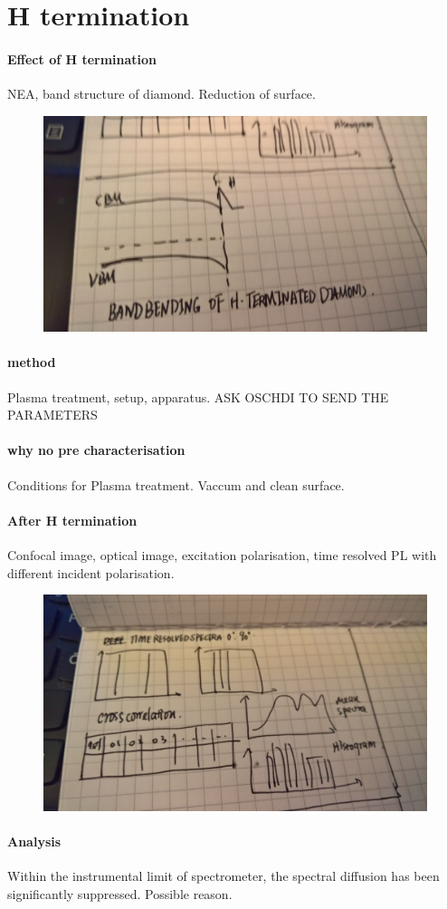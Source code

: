 
\section[H termination]{H termination}
\paragraph{Effect of H termination}

NEA, band structure of diamond. Reduction of surface.
\FloatBarrier
\begin{figure}[h]
\centering
\includegraphics[width=0.7\linewidth]{Figures/pic/WP_20160921_21_05_16_Pro_LI}
\caption{}
\label{fig:wp20160921210516proli}
\end{figure}
\FloatBarrier
\paragraph{method} Plasma treatment, setup, apparatus.
ASK OSCHDI TO SEND THE PARAMETERS

\paragraph{why no pre characterisation} Conditions for Plasma treatment.
Vaccum and clean surface.
\paragraph{After H termination} Confocal image, optical image, excitation polarisation, time resolved PL with different incident polarisation.
\FloatBarrier
\begin{figure}[h]
\centering
\includegraphics[width=0.7\linewidth]{Figures/pic/WP_20160921_21_05_13_Pro_LI}
\caption{}
\label{fig:wp20160921210513proli}
\end{figure}
\FloatBarrier

\paragraph{Analysis} Within the instrumental limit of spectrometer, the spectral diffusion has been significantly suppressed. Possible reason.
